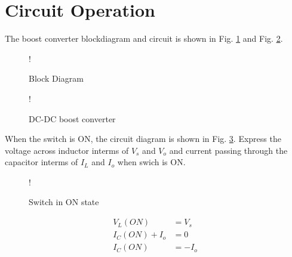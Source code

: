 \documentclass[journal,12pt,twocolumn]{IEEEtran}
\begin{document}
\section{Circuit Operation}
The boost converter blockdiagram and circuit is shown in Fig. \ref{fig1} and Fig. \ref{fig2}.

\begin{figure}[!h]
\centering
\resizebox {\columnwidth} {!} {

}
\caption{Block Diagram} 
\label{fig1}
\end{figure}

\begin{figure}[!h]
\centering
\resizebox {\columnwidth} {!} {

}
\caption{DC-DC boost converter} 
\label{fig2}
\end{figure}


\begin{problem}
When the switch is ON, the circuit diagram is shown in Fig. \ref{fig3}. Express the voltage across inductor interms of $V_{s}$ and $V_{o}$ and current passing through the capacitor interms of $I_{L}$ and $I_{o}$ when swich is ON.  
  \end{problem}
  
  \begin{figure}[!h]
       \centering  
 \resizebox {\columnwidth} {!} {

}   
    \caption{Switch in ON state}\label{fig3}
   \end{figure} 
  \solution
  \begin{align*}
  V_{L}(ON) &= V_{s}\\
  I_{C}(ON) + I_{o} &= 0 \\
  I_{C}(ON) &= -I_{o}
\end{align*} 
\end{document}
